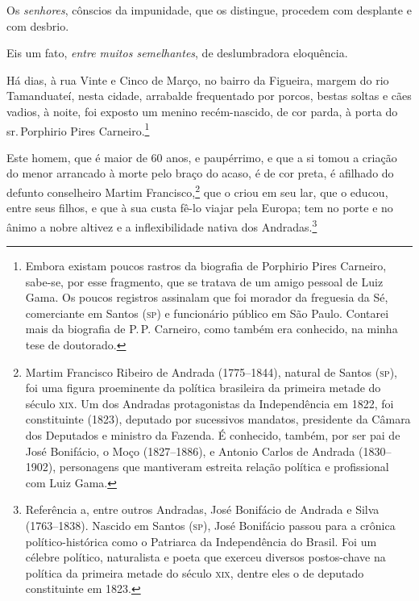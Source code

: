 Os \emph{senhores}, cônscios da impunidade, que os distingue, procedem
com desplante e com desbrio.

Eis um fato, \emph{entre muitos semelhantes}, de deslumbradora
eloquência.

Há dias, à rua Vinte e Cinco de Março, no bairro da Figueira, margem do
rio Tamanduateí, nesta cidade, arrabalde frequentado por porcos, bestas
soltas e cães vadios, à noite, foi exposto um menino recém-nascido, de
cor parda, à porta do sr.\,Porphirio Pires Carneiro.\footnote{Embora
  existam poucos rastros da biografia de Porphirio Pires Carneiro,
  sabe-se, por esse fragmento, que se tratava de um amigo pessoal de
  Luiz Gama. Os poucos registros assinalam que foi morador da
  freguesia da Sé, comerciante em Santos (\textsc{sp}) e funcionário público em
  São Paulo. Contarei mais da biografia de P.\,P. Carneiro, como também
  era conhecido, na minha tese de doutorado.} %

Este homem, que é maior de 60 anos, e paupérrimo, e que a si tomou a
criação do menor arrancado à morte pelo braço do acaso, é de cor preta,
é afilhado do defunto conselheiro Martim Francisco,\footnote{Martim
  Francisco Ribeiro de Andrada (1775--1844), natural de Santos (\textsc{sp}), foi
  uma figura proeminente da política brasileira da primeira metade do
  século \textsc{xix}. Um dos Andradas protagonistas da Independência em 1822,
  foi constituinte (1823), deputado por sucessivos mandatos, presidente
  da Câmara dos Deputados e ministro da Fazenda. É conhecido, também,
  por ser pai de José Bonifácio, o Moço (1827--1886), e Antonio Carlos de
  Andrada (1830--1902), personagens que mantiveram estreita relação
  política e profissional com Luiz Gama.} que o criou em seu lar, que o
educou, entre seus filhos, e que à sua custa fê-lo viajar pela Europa;
tem no porte e no ânimo a nobre altivez e a inflexibilidade nativa dos
Andradas.\footnote{Referência a, entre outros Andradas, José Bonifácio
  de Andrada e Silva (1763--1838). Nascido em Santos (\textsc{sp}), José Bonifácio
  passou para a crônica político-histórica como o Patriarca da
  Independência do Brasil. Foi um célebre político, naturalista e poeta
  que exerceu diversos postos-chave na política da primeira metade do
  século \textsc{xix}, dentre eles o de deputado constituinte em 1823.}

